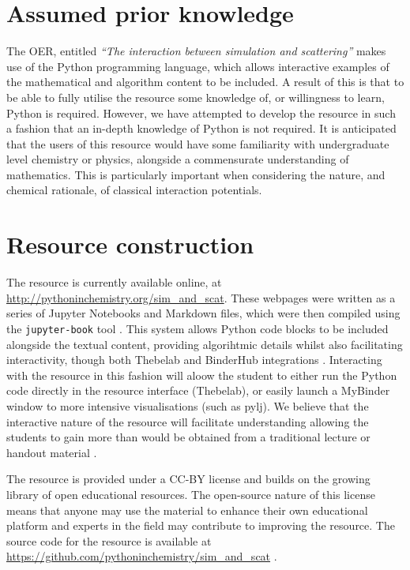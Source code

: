 \documentclass[amsmath,amssymb,twocolumn,superscriptaddress]{revtex4-1}
\begin{document}
\section{Assumed prior knowledge}

The OER, entitled \emph{``The interaction between simulation and scattering''} makes use of the Python programming language, which allows interactive examples of the mathematical and algorithm content to be included.
A result of this is that to be able to fully utilise the resource some knowledge of, or willingness to learn, Python is required.
However, we have attempted to develop the resource in such a fashion that an in-depth knowledge of Python is not required.
It is anticipated that the users of this resource would have some familiarity with undergraduate level chemistry or physics, alongside a commensurate understanding of mathematics.
This is particularly important when considering the nature, and chemical rationale, of classical interaction potentials.

\section{Resource construction}

The resource is currently available online, at \url{http://pythoninchemistry.org/sim_and_scat}.
These webpages were written as a series of Jupyter Notebooks and Markdown files, which were then compiled using the \texttt{jupyter-book} tool \cite{lau_jupyter/jupyter-book_2019}.
This system allows Python code blocks to be included alongside the textual content, providing algorihtmic details whilst also facilitating interactivity, though both Thebelab and BinderHub integrations \cite{ragan-kelley_minrk/thebelab_2019,ragan-kelley_jupyterhub/binderhub_2019,jupyter_binder_2018}.
Interacting with the resource in this fashion will aloow the student to either run the Python code directly in the resource interface (Thebelab), or easily launch a MyBinder window to more intensive visualisations (such as pylj).
We believe that the interactive nature of the resource will facilitate understanding allowing the students to gain more than would be obtained from a traditional lecture or handout material \cite{knuth_literate_1984}.

The resource is provided under a CC-BY license \cite{noauthor_creative_2019} and builds on the growing library of open educational resources.
The open-source nature of this license means that anyone may use the material to enhance their own educational platform and experts in the field may contribute to improving the resource.
The source code for the resource is available at \url{https://github.com/pythoninchemistry/sim_and_scat} \cite{mccluskey_pythoninchemistry/sim_and_scat_2019}.
\end{document}
